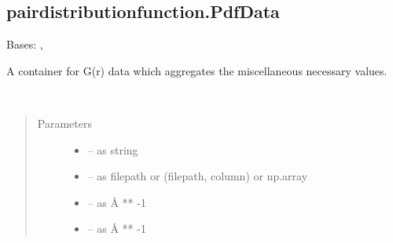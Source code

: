 \documentclass[letterpaper,10pt,english]{sphinxmanual}
\begin{document}
\subsection{pairdistributionfunction.PdfData}
\label{\detokenize{rst/pairdistributionfunction:pairdistributionfunction-pdfdata}}

\begin{fulllineitems}
\label{\detokenize{rst/pairdistributionfunction:mstack.pairdistributionfunction.PdfData}}
Bases: {\hyperref[\detokenize{rst/utilities:mstack.utilities.UpdateMethods}]{}}, {\hyperref[\detokenize{rst/utilities:mstack.utilities.MergeParams}]{}}

A container for G(r) data which aggregates the miscellaneous necessary values.

\begin{fulllineitems}
\label{\detokenize{rst/pairdistributionfunction:mstack.pairdistributionfunction.PdfData.__init__}}~\begin{quote}\begin{description}
\item[{Parameters}] \leavevmode\begin{itemize}
\item {} 
 -- as string

\item {} 
 -- as filepath or (filepath, column) or np.array

\item {} 
 -- as Å ** -1

\item {} 
 -- as Å ** -1


\end{itemize}
\end{description}
\end{quote}
\end{fulllineitems}
\end{fulllineitems}
\end{document}
